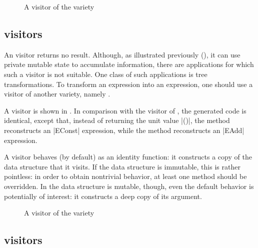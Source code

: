 \documentclass[11pt,a4paper,twoside]{article}
\begin{document}

\begin{figure}[p]
\vspace{-\baselineskip}
\caption{A visitor of the \map variety}
\label{fig:expr01}
\end{figure}

\subsection{\map visitors}
\label{sec:intro:map}

An \iter visitor returns no result. Although, as illustrated previously
(), it can use private mutable state to accumulate
information, there are applications for which such a visitor is not suitable.
One class of such applications is tree transformations. To transform an
expression into an expression, one should use a visitor of another variety,
namely \map.

A \map visitor is shown in . In comparison with the \iter
visitor of , the generated code is identical, except that,
instead of returning the unit value \oc|()|, the method
 reconstructs an \oc|EConst| expression, while the
method  reconstructs an \oc|EAdd| expression.

A \map visitor behaves (by default) as an identity function: it constructs a
copy of the data structure that it visits. If the data structure is immutable,
this is rather pointless: in order to obtain nontrivial behavior, at least one
method should be overridden. In the data structure is mutable, though, even
the default behavior is potentially of interest: it constructs a deep copy of
its argument.


\begin{figure}[p]
\vspace{-\baselineskip}
\caption{A visitor of the \mapendo variety}
\label{fig:expr00endo}
\end{figure}

\subsection{\mapendo visitors}
\label{sec:intro:endo}
\end{document}
